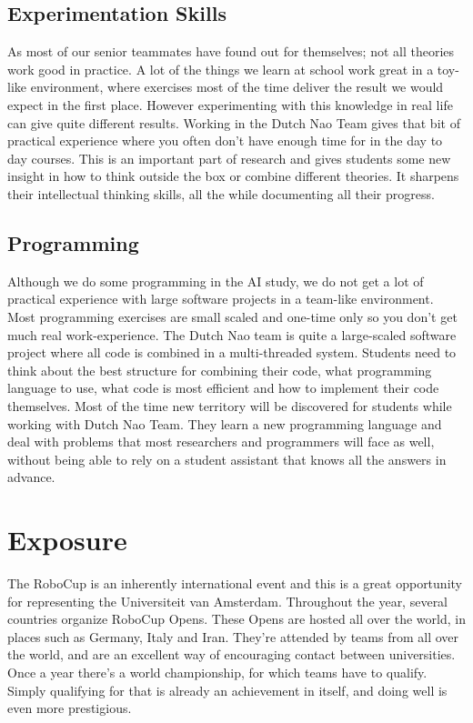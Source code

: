 \documentclass[11pt]{article}
\begin{document}
\subsection{Experimentation Skills}
As most of our senior teammates have found out for themselves; not all theories work good in practice. A lot of the things we learn at school work great in a toy-like environment, where exercises most of the time deliver the result we would expect in the first place. However experimenting with this knowledge in real life can give quite different results. Working in the Dutch Nao Team gives that bit of practical experience where you often don't have enough time for in the day to day courses. This is an important part of research and gives students some new insight in how to think outside the box or combine different theories. It sharpens their intellectual thinking skills, all the while documenting all their progress.

\subsection{Programming}
Although we do some programming in the AI study, we do not get a lot of practical experience with large software projects in a team-like environment. Most programming exercises are small scaled and one-time only so you don’t get much real work-experience. The Dutch Nao team is quite a large-scaled software project where all code is combined in a multi-threaded system. Students need to think about the best structure for combining their code, what programming language to use, what code is most efficient and how to implement their code themselves. Most of the time new territory will be discovered for students while working with Dutch Nao Team. They learn a new programming language and deal with problems that most researchers and programmers will face as well, without being able to rely on a student assistant that knows all the answers in advance.

\section{Exposure}
The RoboCup is an inherently international event and this is a great opportunity for representing the Universiteit van Amsterdam. Throughout the year, several countries organize RoboCup Opens. These Opens are hosted all over the world, in places such as Germany, Italy and Iran. They’re attended by teams from all over the world, and are an excellent way of encouraging contact between universities. Once a year there’s a world championship, for which teams have to qualify. Simply qualifying for that is already an achievement in itself, and doing well is even more prestigious. 
\end{document}
